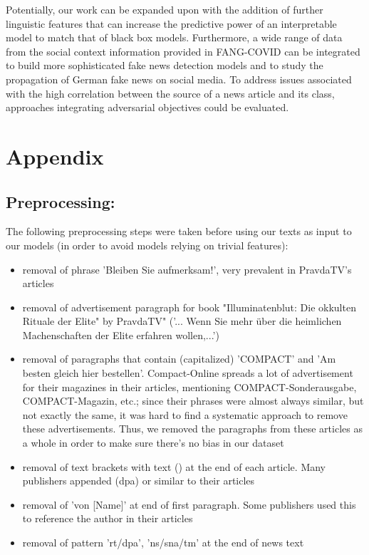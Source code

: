 \documentclass[11pt]{article}
\begin{document}
Potentially, our work can be expanded upon with the addition of further linguistic features that can increase the predictive power of an interpretable model to match that of black box models. Furthermore, a wide range of data from the social context information provided in FANG-COVID can be integrated to build more sophisticated fake news detection models and to study the propagation of German fake news on social media. To address issues associated with the high correlation between the source of a news article and its class, approaches integrating adversarial objectives \citep{DBLP:journals/corr/abs-2010-05338} could be evaluated.


\FloatBarrier



\FloatBarrier



\clearpage
\appendix

\section{Appendix}

\subsection{Preprocessing:}
The following preprocessing steps were taken before using our texts as input to our models (in order to avoid models relying on trivial features):

\begin{itemize}
\item removal of phrase 'Bleiben Sie aufmerksam!', very prevalent in PravdaTV's articles
\item removal of advertisement paragraph for book "Illuminatenblut: Die okkulten Rituale der Elite" by PravdaTV" ('... Wenn Sie mehr über die heimlichen Machenschaften der Elite erfahren wollen,...')


\item removal of paragraphs that contain (capitalized) 'COMPACT' and 'Am besten gleich hier bestellen'. Compact-Online spreads a lot of advertisement for their magazines in their articles, mentioning COMPACT-Sonderausgabe, COMPACT-Magazin, etc.; since their phrases were almost always similar, but not exactly the same, it was hard to find a systematic approach to remove these advertisements. Thus, we removed the paragraphs from these articles as a whole in order to make sure there's no bias in our dataset

\item removal of text brackets with text () at the end of each article. Many publishers appended (dpa) or similar to their articles

\item removal of 'von [Name]' at end of first paragraph. Some publishers used this to reference the author in their articles
\item removal of pattern 'rt/dpa', 'ns/sna/tm' at the end of news text

\end{itemize}
\label{sec:appendix}
\end{document}
